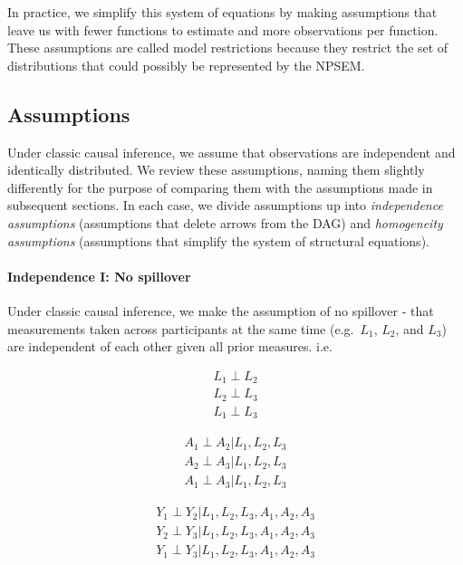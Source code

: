 \documentclass[
  letterpaper,
  DIV=11,
  numbers=noendperiod,
  oneside]{scrreprt}
\let\oldparagraph\paragraph
\renewcommand{\paragraph}[1]{\oldparagraph{#1}\mbox{}}
\begin{document}
In practice, we simplify this system of equations by making assumptions
that leave us with fewer functions to estimate and more observations per
function. These assumptions are called model restrictions because they
restrict the set of distributions that could possibly be represented by
the NPSEM.

\hypertarget{sec-assumptions-classic}{%
\subsection{Assumptions}\label{sec-assumptions-classic}}

Under classic causal inference, we assume that observations are
independent and identically distributed. We review these assumptions,
naming them slightly differently for the purpose of comparing them with
the assumptions made in subsequent sections. In each case, we divide
assumptions up into \emph{independence assumptions} (assumptions that
delete arrows from the DAG) and \emph{homogeneity assumptions}
(assumptions that simplify the system of structural equations).

\hypertarget{independence-i-no-spillover}{%
\paragraph{Independence I: No
spillover}\label{independence-i-no-spillover}}

Under classic causal inference, we make the assumption of no spillover -
that measurements taken across participants at the same time
(e.g.~\(L_1\), \(L_2\), and \(L_3\)) are independent of each other given
all prior measures. i.e.

\[
\begin{aligned}
L_1 \perp L_2 \\
L_2 \perp L_3 \\
L_1 \perp L_3 
\end{aligned}
\]

\[
\begin{aligned}
A_1 \perp A_2 | L_1, L_2, L_3\\
A_2 \perp A_3 | L_1, L_2, L_3 \\
A_1 \perp A_3 | L_1, L_2, L_3 
\end{aligned}
\]

\[
\begin{aligned}
Y_1 \perp Y_2 | L_1, L_2, L_3, A_1, A_2, A_3\\
Y_2 \perp Y_3 | L_1, L_2, L_3, A_1, A_2, A_3 \\
Y_1 \perp Y_3 | L_1, L_2, L_3, A_1, A_2, A_3 
\end{aligned}
\]
\end{document}
